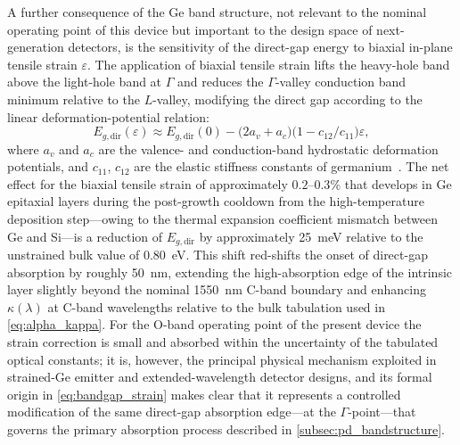 A further consequence of the Ge band structure, not relevant to the nominal
operating point of this device but important to the design space of next-generation
detectors, is the sensitivity of the direct-gap energy to biaxial in-plane
tensile strain $\varepsilon$. The application of biaxial tensile strain lifts
the heavy-hole band above the light-hole band at $\Gamma$ and reduces the
$\Gamma$-valley conduction band minimum relative to the $L$-valley, modifying
the direct gap according to the linear deformation-potential relation:
\begin{equation}
    E_{g,\mathrm{dir}}(\varepsilon)
    \approx E_{g,\mathrm{dir}}(0)
      - \bigl(2a_v + a_c\bigr)\bigl(1 - c_{12}/c_{11}\bigr)\varepsilon,
    \label{eq:bandgap_strain}
\end{equation}
where $a_v$ and $a_c$ are the valence- and conduction-band hydrostatic
deformation potentials, and $c_{11}$, $c_{12}$ are the elastic stiffness
constants of germanium~\cite{Yan2024}. The net effect for the biaxial tensile
strain of approximately $0.2$--$0.3\%$ that develops in Ge epitaxial layers
during the post-growth cooldown from the high-temperature deposition step—owing
to the thermal expansion coefficient mismatch between Ge and Si—is a reduction
of $E_{g,\mathrm{dir}}$ by approximately \SI{25}{\milli\electronvolt} relative
to the unstrained bulk value of \SI{0.80}{\electronvolt}. This shift red-shifts
the onset of direct-gap absorption by roughly \SI{50}{\nano\metre}, extending
the high-absorption edge of the intrinsic layer slightly beyond the nominal
\SI{1550}{\nano\metre} C-band boundary and enhancing $\kappa(\lambda)$ at
C-band wavelengths relative to the bulk tabulation used in
\cref{eq:alpha_kappa}. For the O-band operating point of the present device
the strain correction is small and absorbed within the uncertainty of the
tabulated optical constants; it is, however, the principal physical mechanism
exploited in strained-Ge emitter and extended-wavelength detector designs, and
its formal origin in \cref{eq:bandgap_strain} makes clear that it represents a
controlled modification of the same direct-gap absorption edge—at the
$\Gamma$-point—that governs the primary absorption process described in
\cref{subsec:pd_bandstructure}.



